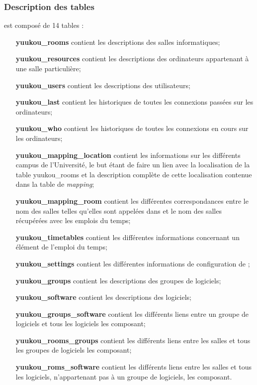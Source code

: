 \begin{appendices}
\subsubsection{Description des tables}

\noindent {\YuukouII} est compos\'e de 14 tables :

\begin{itemize}
	\item[\textbf{\textsf{yuukou\_rooms}}] contient les descriptions des salles informatiques;
	\item[\textbf{\textsf{yuukou\_resources}}] contient les descriptions des ordinateurs appartenant \`a une salle particuli\`ere;
	\item[\textbf{\textsf{yuukou\_users}}] contient les descriptions des utilisateurs;
	\item[\textbf{\textsf{yuukou\_last}}] contient les historiques de toutes les connexions pass\'ees sur les ordinateurs;
	\item[\textbf{\textsf{yuukou\_who}}] contient les historiques de toutes les connexions en cours sur les ordinateurs;
	\item[\textbf{\textsf{yuukou\_mapping\_location}}] contient les informations sur les diff\'erents campus de l'Universit\'e, le but \'etant de faire un lien avec la localisation de la table \textsf{yuukou\_rooms} et la description compl\`ete de cette localisation contenue dans la table de \textit{mapping};
	\item[\textbf{\textsf{yuukou\_mapping\_room}}] contient les diff\'erentes correspondances entre le nom des salles telles qu'elles sont appel\'ees dans {\YuukouII} et le nom des salles r\'ecup\'er\'ees avec les emplois du temps;
	\item[\textbf{\textsf{yuukou\_timetables}}] contient les diff\'erentes informations concernant un \'el\'ement de l'emploi du temps;
	\item[\textbf{\textsf{yuukou\_settings}}] contient les diff\'erentes informations de configuration de \YuukouII;
	\item[\textbf{\textsf{yuukou\_groups}}] contient les descriptions des groupes de logiciels;
	\item[\textbf{\textsf{yuukou\_software}}] contient les descriptions des logiciels;
	\item[\textbf{\textsf{yuukou\_groups\_software}}] contient les diff\'erents liens entre un groupe de logiciels et tous les logiciels les composant;
	\item[\textbf{\textsf{yuukou\_rooms\_groups}}] contient les diff\'erents liens entre les salles et tous les groupes de logiciels les composant;
	\item[\textbf{\textsf{yuukou\_roms\_software}}] contient les diff\'erents liens entre les salles et tous les logiciels, n'appartenant pas \`a un groupe de logiciels, les composant.
	

\end{itemize}
\end{appendices}
